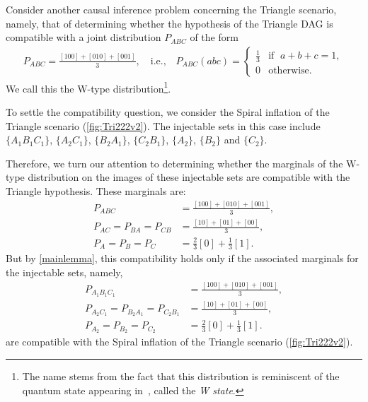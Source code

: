 Consider another causal inference problem concerning the Triangle scenario, namely, that of determining whether the hypothesis of the Triangle DAG is compatible with a joint distribution 
$P_{A B C}$ of the form
\begin{align}\label{eq:wdistribution1}
P_{A B C}=\frac{[100]+[010]+[001]}{3},\quad\text{i.e.,}\quad P_{A B C}(a b c)=\begin{cases}\tfrac{1}{3}&\text{if }\; a + b + c = 1, \\ 0&\text{otherwise}.\end{cases}
\end{align}
We call this the W-type distribution\footnote{The name stems from the fact that this distribution is reminiscent of 
the quantum state appearing in~\cite{3Qubits2Ways}, called the \emph{W state}.}. 

To settle the compatibility question, we consider the Spiral inflation of the Triangle scenario (\cref{fig:Tri222v2}).
The injectable sets in this case include $\{A_1 B_1 C_1\}$, $\{A_2 C_1\}$, $\{B_2 A_1\}$, $\{C_2 B_1\}$,  $\{A_2\}$, $\{B_2\}$ and $\{C_2\}$. 

Therefore, we turn our attention to determining whether the marginals of the W-type distribution on the images of these injectable sets are compatible with the Triangle hypothesis.  These marginals are:
\begin{align}
P_{A B C}&= \frac{[100]+[010]+[001]}{3}, \label{V4}\\
P_{A C}= P_{B A} = P_{C B} & = \frac{[10]+[01]+[00]}{3}, \label{V1}\\
P_{A}= P_B = P_C & = \frac{2}{3}[0] + \frac{1}{3}[1]. \label{V5}
\end{align}
But by \cref{mainlemma}, this compatibility holds only if the associated marginals for the injectable sets, namely, 
\begin{align}
P_{A_1 B_1 C_1}&= \frac{[100]+[010]+[001]}{3}, \label{W4}\\
P_{A_2 C_1} = P_{B_2 A_1} = P_{C_2 B_1} & = \frac{[10]+[01]+[00]}{3}, \label{W1}\\
P_{A_2} = P_{B_2} = P_{C_2} & = \frac{2}{3}[0] + \frac{1}{3}[1]. \label{W5}
\end{align}
are compatible with the Spiral inflation of the Triangle scenario (\cref{fig:Tri222v2})\color{black}.

